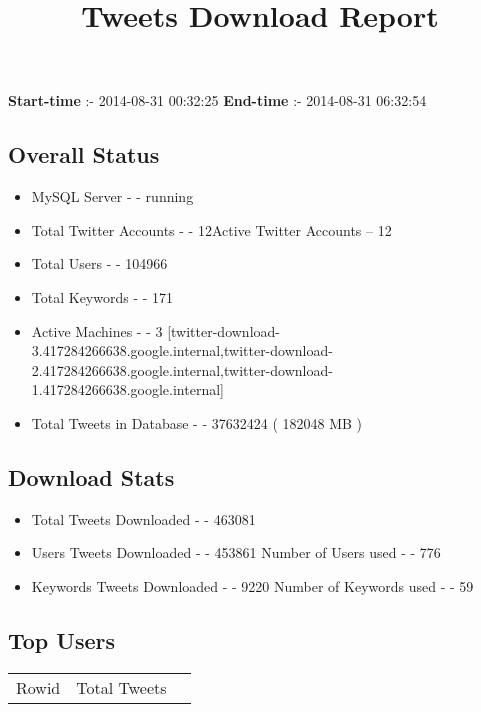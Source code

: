\documentclass{article}\usepackage[T1]{fontenc}
\begin{document}
\title{\textbf{Tweets Download Report}}
               \date{}
                \maketitle
               \centerline{\textbf{Start-time} :- 2014-08-31 00:32:25 \hspace{40pt} \textbf{End-time} :- 2014-08-31 06:32:54}               \subsection*{Overall Status}                \begin{itemize}                \item MySQL Server - - running               \item Total Twitter Accounts - - 12\newline Active Twitter Accounts -- 12               \item Total Users - - 104966               \item Total Keywords - - 171               \item Active Machines - - 3 [twitter-download-3.417284266638.google.internal,twitter-download-2.417284266638.google.internal,twitter-download-1.417284266638.google.internal]               \item Total Tweets in Database - - 37632424 ( 182048 MB )               \end{itemize}               \subsection*{Download Stats}                \begin{itemize}                \item Total Tweets Downloaded - - 463081               \item Users Tweets Downloaded - - 453861 \newline Number of Users used - - 776               \item Keywords Tweets Downloaded - - 9220 \newline Number of Keywords used - - 59              \end{itemize}              \subsection*{Top Users}\begin{tabular}{|c|c|c|}         \hline         Rowid & Total Tweets \\ 

\end{tabular}
\end{document}
